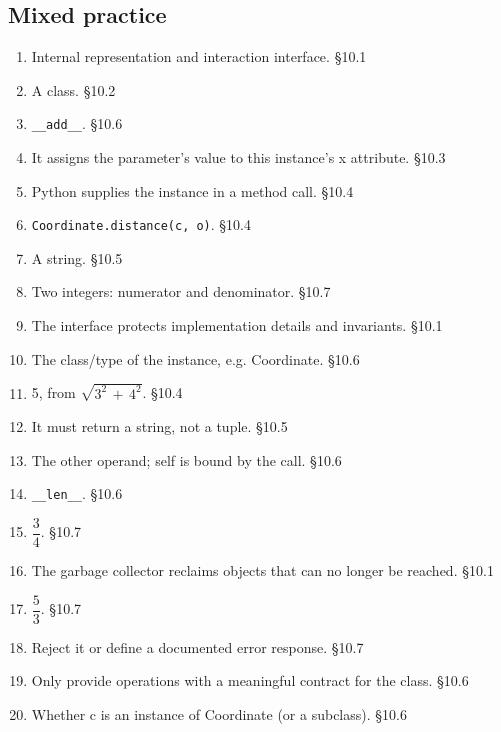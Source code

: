 \documentclass[11pt]{article}
\begin{document}
\begin{keepsection}\subsection{Mixed practice}

\begin{enumerate}
\item Internal representation and interaction interface. \hfill{\small\color{FAUblue}§10.1}
\item A class. \hfill{\small\color{FAUblue}§10.2}
\item \texttt{\_\_add\_\_}. \hfill{\small\color{FAUblue}§10.6}
\item It assigns the parameter’s value to this instance’s x attribute. \hfill{\small\color{FAUblue}§10.3}
\item Python supplies the instance in a method call. \hfill{\small\color{FAUblue}§10.4}
\item \texttt{Coordinate.distance(c, o)}. \hfill{\small\color{FAUblue}§10.4}
\item A string. \hfill{\small\color{FAUblue}§10.5}
\item Two integers: numerator and denominator. \hfill{\small\color{FAUblue}§10.7}
\item The interface protects implementation details and invariants. \hfill{\small\color{FAUblue}§10.1}
\item The class/type of the instance, e.g. Coordinate. \hfill{\small\color{FAUblue}§10.6}
\item 5, from \ensuremath{\sqrt{3^{2}\, +\, 4^{2}}}. \hfill{\small\color{FAUblue}§10.4}
\item It must return a string, not a tuple. \hfill{\small\color{FAUblue}§10.5}
\item The other operand; self is bound by the call. \hfill{\small\color{FAUblue}§10.6}
\item \texttt{\_\_len\_\_}. \hfill{\small\color{FAUblue}§10.6}
\item {\small\ensuremath{\dfrac{3}{4}}}. \hfill{\small\color{FAUblue}§10.7}
\item The garbage collector reclaims objects that can no longer be reached. \hfill{\small\color{FAUblue}§10.1}
\item {\small\ensuremath{\dfrac{5}{3}}}. \hfill{\small\color{FAUblue}§10.7}
\item Reject it or define a documented error response. \hfill{\small\color{FAUblue}§10.7}
\item Only provide operations with a meaningful contract for the class. \hfill{\small\color{FAUblue}§10.6}
\item Whether c is an instance of Coordinate (or a subclass). \hfill{\small\color{FAUblue}§10.6}
\end{enumerate}

\end{keepsection}
\end{document}
